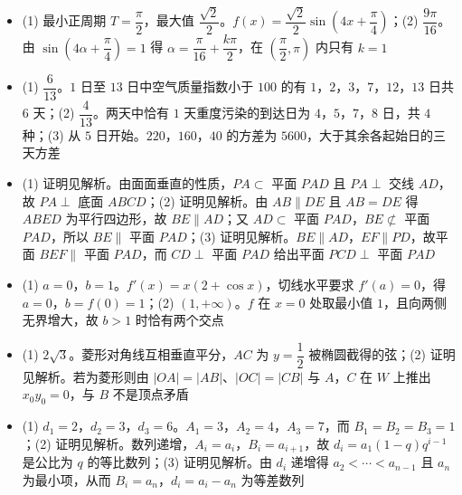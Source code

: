 \begin{itemize}[leftmargin=2.6em]
  \item[\textbf{15.}] (1) 最小正周期 $T=\dfrac{\pi}2$，最大值 $\dfrac{\sqrt2}2$。$f(x)=\dfrac{\sqrt2}2\sin\left(4x+\dfrac{\pi}4\right)$；(2) $\dfrac{9\pi}{16}$。由 $\sin\left(4\alpha+\dfrac{\pi}4\right)=1$ 得 $\alpha=\dfrac{\pi}{16}+\dfrac{k\pi}2$，在 $\left(\dfrac{\pi}2,\pi\right)$ 内只有 $k=1$
  \item[\textbf{16.}] (1) $\dfrac6{13}$。$1$ 日至 $13$ 日中空气质量指数小于 $100$ 的有 $1$，$2$，$3$，$7$，$12$，$13$ 日共 $6$ 天；(2) $\dfrac4{13}$。两天中恰有 $1$ 天重度污染的到达日为 $4$，$5$，$7$，$8$ 日，共 $4$ 种；(3) 从 $5$ 日开始。$220$，$160$，$40$ 的方差为 $5600$，大于其余各起始日的三天方差
  \item[\textbf{17.}] (1) 证明见解析。由面面垂直的性质，$PA\subset$ 平面 $PAD$ 且 $PA\perp$ 交线 $AD$，故 $PA\perp$ 底面 $ABCD$；(2) 证明见解析。由 $AB\parallel DE$ 且 $AB=DE$ 得 $ABED$ 为平行四边形，故 $BE\parallel AD$；又 $AD\subset$ 平面 $PAD$，$BE\not\subset$ 平面 $PAD$，所以 $BE\parallel$ 平面 $PAD$；(3) 证明见解析。$BE\parallel AD$，$EF\parallel PD$，故平面 $BEF\parallel$ 平面 $PAD$，而 $CD\perp$ 平面 $PAD$ 给出平面 $PCD\perp$ 平面 $PAD$
  \item[\textbf{18.}] (1) $a=0$，$b=1$。$f'(x)=x(2+\cos x)$，切线水平要求 $f'(a)=0$，得 $a=0$，$b=f(0)=1$；(2) $(1,+\infty)$。$f$ 在 $x=0$ 处取最小值 $1$，且向两侧无界增大，故 $b>1$ 时恰有两个交点
  \item[\textbf{19.}] (1) $2\sqrt3$。菱形对角线互相垂直平分，$AC$ 为 $y=\dfrac12$ 被椭圆截得的弦；(2) 证明见解析。若为菱形则由 $|OA|=|AB|$、$|OC|=|CB|$ 与 $A$，$C$ 在 $W$ 上推出 $x_0y_0=0$，与 $B$ 不是顶点矛盾
  \item[\textbf{20.}] (1) $d_1=2$，$d_2=3$，$d_3=6$。$A_1=3$，$A_2=4$，$A_3=7$，而 $B_1=B_2=B_3=1$；(2) 证明见解析。数列递增，$A_i=a_i$，$B_i=a_{i+1}$，故 $d_i=a_1(1-q)q^{i-1}$ 是公比为 $q$ 的等比数列；(3) 证明见解析。由 $d_i$ 递增得 $a_2<\cdots<a_{n-1}$ 且 $a_n$ 为最小项，从而 $B_i=a_n$，$d_i=a_i-a_n$ 为等差数列
\end{itemize}
